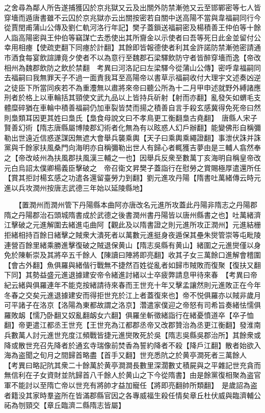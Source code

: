 之舍尋為鄰人所告遂捕獲囚於京兆獄又云及出關外防禁漸弛又云至邯鄲密等七人皆穿墻而遁唐書雖不云囚於京兆獄亦云出關按密若自關中送高陽不當與韋福嗣同行今從賈閏甫蒲山公傳及劉仁軌河洛行年記】樊子蓋鎻送福嗣密及楊積善王仲伯等十餘人詣高陽密與王仲伯等竊謀亡去悉使出其所齎金以示使者曰吾等死日此金並留付公幸用相瘞【使疏吏翻下同瘞於計翻】其餘即皆報德使者利其金許諾防禁漸弛密請通市酒食每宴飲諠譁竟夕使者不以為意行至魏郡石梁驛飲防守者皆醉穿墻而逸【帝改相州為魏郡飲防之飲於禁翻　考異曰河洛記曰左梁驛今從蒲山公傳】密呼韋福嗣同去福嗣曰我無罪天子不過一面責我耳至高陽帝以書草示福嗣收付大理宇文述奏凶逆之徒臣下所當同疾若不為重灋無以肅將來帝曰聽公所為十二月甲申述就野外縛諸應刑者於格上以車輪括其頸使文武九品以上皆持兵斫射【射而亦翻】亂發矢如蝟毛支體糜碎猶在車輪中積善福嗣仍加車裂皆焚而揚之積善自言手殺玄感冀得免死帝曰然則梟類耳因更其姓曰梟氏【梟食母說文曰不孝鳥更工衡翻梟古堯翻】　唐縣人宋子賢善幻術【隋志唐縣屬博陵郡幻術者化無為有以眩惑人幻戶辦翻】能變佛形自稱彌勒出世遠近信惑遂謀因無遮大會舉兵襲乘輿【天子曰乘輿乘繩證翻】事泄伏誅并誅黨與千餘家扶風桑門向海明亦自稱彌勒出世人有歸心者輒獲吉夢由是三輔人翕然奉之【帝改岐州為扶風郡扶風漢三輔之一也】因舉兵反衆至數萬丁亥海明自稱皇帝改元白烏詔太僕卿楊義臣擊破之　帝召衛文昇樊子蓋詣行在慰勞之賞賜極厚遣還所任【賞其拒討楊玄感之功遣各還留臺勞力到翻】劉元進攻丹陽【隋書吐萬緒傳云時元進以兵攻潤州按唐志武德三年始以延陵縣地】

　　【置潤州而潤州管下丹陽縣本曲阿亦唐改名元進所攻蓋此丹陽非隋志之丹陽郡隋之丹陽郡治石頭城隋書成於武德之後書潤州書丹陽皆以唐州縣書之也】吐萬緒濟江擊破之元進解圍去緒進屯曲阿【觀此及以隋書證之則元進所攻正潤州】元進結栅拒緒相持百餘日緒擊之賊衆大潰死者以萬數元進挺身夜遁保其壘朱爕管崇等屯毗陵連營百餘里緒乘勝進擊復破之賊退保黄山【隋志吳縣有黄山】緒圍之元進爕僅以身免於陳斬崇及其將卒五千餘人【陳讀曰陣將即亮翻】收其子女三萬餘口進解會稽圍【會古外翻】魚俱羅與緒偕行戰無不捷然百姓從亂者如歸市賊敗而復聚【復扶又翻下同】其勢益盛元進退據建安帝令緒進討緒以士卒疲弊請息甲待來春　【考異曰帝紀云緒與俱羅連年不能克按緒請待來春而王世充十年又擊孟讓然則元進敗正在今年冬春之交矣元進退據建安而得拒世充於江上者蓋復來也】帝不悦俱羅亦以賊非歲月可平諸子在洛京【洛陽為東都故謂之洛京】濳遣家僕迎之帝怒有司希旨奏緒怯懦俱羅敗衂【懦乃卧翻又奴亂翻衂女六翻】俱羅坐斬徵緒詣行在緒憂憤道卒【卒子恤翻】帝更遣江都丞王世充【王世充為江都郡丞帝又改郡贊治為丞更江衡翻】發淮南兵數萬人討元進世充度江頻戰皆捷元進爕敗死於吳【隋志吳縣吳郡治所】其餘衆或降或散世充召先降者於通玄寺瑞像前焚香為誓約降者不殺【降戶江翻】散者始欲入海為盗聞之旬月之間歸首略盡【首手又翻】世充悉阬之於黄亭澗死者三萬餘人　【考異曰略記阬其衆二十餘萬於黄亭澗澗長數里深濶數丈積屍與之平雜記世充貪而無信利在子女資財並阬歸首八千餘人於黄山之下今從隋書】由是餘黨復相聚為盗官軍不能討以至隋亡帝以世充有將帥才益加寵任【將即亮翻帥所類翻】　是歲詔為盗者籍没其家時羣盗所在皆滿郡縣官因之各專威福生殺任情矣章丘杜伏威與臨濟輔公祏為刎頸交【章丘臨濟二縣隋志皆屬】

